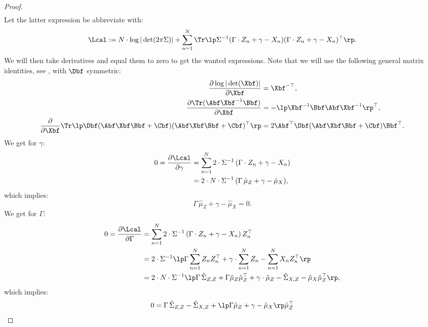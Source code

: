 \begin{Lem}
\begin{proof}
\begin{align*}
    \end{align*}
Let the latter expression be abbreviate with:
\[\Lcal  :=N \cdot \log |\det(2\pi\Sigma)| + \sum_{n=1}^N \Tr\lp \Sigma^{-1}(\Gamma \cdot Z_n + \gamma - X_n)(\Gamma \cdot Z_n + \gamma - X_n)^\top \rp.\]
    We will then take derivatives and equal them to zero to get the wanted expressions. 
Note that we will use the following general matrix identities, see \cite{matrixcookbook}, with $\Dbf$ symmetric:
\begin{align*}
    \frac{\partial \log | \det(\Xbf)|}{\partial \Xbf} &= \Xbf^{-\top},\\
    \frac{\partial \Tr(\Abf \Xbf^{-1} \Bbf) }{ \partial \Xbf } &= - \lp \Xbf^{-1} \Bbf \Abf \Xbf^{-1} \rp^\top,\\
    \frac{\partial}{\partial \Xbf} \Tr \lp \Dbf (\Abf\Xbf\Bbf+\Cbf)(\Abf\Xbf\Bbf+\Cbf)^\top\rp 
    &= 2 \Abf^\top \Dbf (\Abf \Xbf \Bbf + \Cbf) \Bbf^\top.
\end{align*}
We get for $\gamma$:
\begin{align*}
 0 = \frac{\partial \Lcal}{\partial \gamma} & = \sum_{n=1}^N  2 \cdot \Sigma^{-1}\,(\Gamma \cdot Z_n + \gamma - X_n) \\
 &= 2 \cdot N \cdot \Sigma^{-1} \, ( \Gamma\, \hat \mu_Z + \gamma - \hat \mu_X), 
 \end{align*}
 which implies:
 \[ \Gamma\, \hat \mu_Z + \gamma - \hat \mu_X = 0.  \]
We get for $\Gamma$:
\begin{align*}
 0 = \frac{\partial \Lcal}{\partial \Gamma} & = \sum_{n=1}^N  2 \cdot \Sigma^{-1}\,(\Gamma \cdot Z_n + \gamma - X_n)\, Z_n^\top \\
 &= 2 \cdot \Sigma^{-1} \lp \Gamma \sum_{n=1}^N Z_n Z_n^\top + \gamma \cdot \sum_{n=1}^N Z_n - \sum_{n=1}^N X_n Z_n^\top    \rp\\ 
 &= 2 \cdot N \cdot \Sigma^{-1} \lp \Gamma\, \hat \Sigma_{Z,Z} + \Gamma \hat\mu_Z \hat \mu_Z^\top + \gamma \cdot \hat \mu_Z - 
  \hat \Sigma_{X,Z} - \hat \mu_X \hat \mu_Z^\top \rp, 
 \end{align*}
 which implies:
 \begin{align*}
     0 &= \Gamma\, \hat \Sigma_{Z,Z} - \hat \Sigma_{X,Z} + \lp \Gamma \hat\mu_Z  + \gamma - \hat \mu_X \rp \hat \mu_Z^\top \\

\end{align*}
\end{proof}
\end{Lem}

